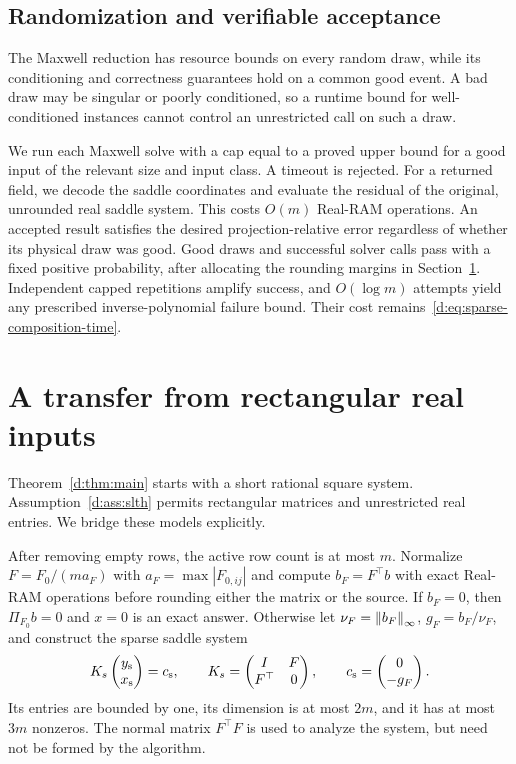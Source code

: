 \subsection{Randomization and verifiable acceptance}

The Maxwell reduction has resource bounds on every random draw, while
its conditioning and correctness guarantees hold on a common good
event. A bad draw may be singular or poorly conditioned, so a runtime
bound for well-conditioned instances cannot control an unrestricted
call on such a draw.

We run each Maxwell solve with a cap equal to a proved upper bound for
a good input of the relevant size and input class. A timeout is rejected.
For a returned field, we decode the saddle coordinates and evaluate
the residual of the original, unrounded real saddle system. This costs
$O(m)$ Real-RAM operations. An accepted result satisfies the desired
projection-relative error regardless of whether its physical draw was
good. Good draws and successful solver calls pass with a fixed positive
probability, after allocating the rounding margins in
Section~\ref{d:app:real-transfer}. Independent capped repetitions amplify
success, and $O(\log m)$ attempts yield any prescribed inverse-polynomial
failure bound. Their cost remains~\eqref{d:eq:sparse-composition-time}.

\section{A transfer from rectangular real inputs}
\label{d:app:real-transfer}

Theorem~\ref{d:thm:main} starts with a short rational square system.
Assumption~\ref{d:ass:slth} permits rectangular matrices and
unrestricted real entries. We bridge these models explicitly.

After removing empty rows, the active row count is at most $m$. Normalize
$F=F_0/(ma_F)$ with $a_F=\max|F_{0,ij}|$ and compute $b_F=F^\top b$ with exact Real-RAM
operations before rounding either the matrix or the source. If $b_F=0$,
then $\Pi_{F_0}b=0$ and $x=0$ is an exact answer. Otherwise let
$\nu_F=\left\lVert b_F\right\rVert_\infty$, $g_F=b_F/\nu_F$, and construct the sparse saddle system
\begin{equation}
 K_s\begin{pmatrix}y_{\rm s}\\x_{\rm s}\end{pmatrix}=c_{\rm s},
 \qquad
 K_s=\begin{pmatrix}I&F\\F^\top&0\end{pmatrix},
 \qquad c_{\rm s}=\begin{pmatrix}0\\-g_F\end{pmatrix}.
 \label{d:eq:complexity-saddle}
\end{equation}
Its entries are bounded by one, its dimension is at most $2m$, and it has
at most $3m$ nonzeros. The normal matrix $F^\top F$ is used to analyze
the system, but need not be formed by the algorithm.

